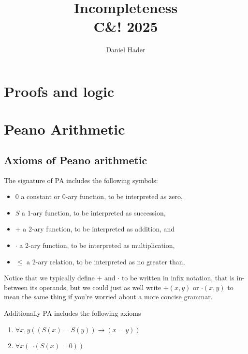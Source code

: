 \documentclass[10pt]{article}
\title{Incompleteness\\\large C\&! 2025}
\author{Daniel Hader}
\date{}
\begin{document}
	\maketitle
	
	\section{Proofs and logic}
	
	
	
	 
	\section{Peano Arithmetic}
	
	\subsection{Axioms of Peano arithmetic}
	The signature of PA includes the following symbols:
	\begin{itemize}
		\item $0$ a constant or 0-ary function, to be interpreted as zero,
		\item $S$ a 1-ary function, to be interpreted as succession,
		\item $+$ a 2-ary function, to be interpreted as addition, and
		\item $\cdot$ a 2-ary function, to be interpreted as multiplication,
		\item $\le$ a 2-ary relation, to be interpreted as no greater than,
	\end{itemize}
	
	Notice that we typically define $+$ and $\cdot$ to be written in infix notation, that is in-between its operands, but we could just as well write $+(x, y)$ or $\cdot(x, y)$ to mean the same thing if you're worried about a more concise grammar.
	
	Additionally PA includes the following axioms
	
	\begin{tcolorbox}[colback=green!5!white,colframe=green!75!black,title={\bf Successor axioms}]
		\begin{enumerate}[label=S.\arabic*]
			\item $\forall x, y ((S(x)=S(y)) \to (x=y))$ \label{ax:succ-inj}
			\item $\forall x (\lnot (S(x)=0))$ \label{ax:succ-first}
		\end{enumerate}
	\end{tcolorbox}
	
\end{document}
